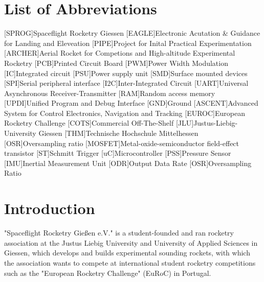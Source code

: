 \documentclass[fontsize=11pt,%
twoside,%
BCOR          = 8mm, %
DIV           = 11,  %
titlepage     = off,%
index=totoc,%
xcolor        = pdftex,%
dvipsnames,%
bibliography  = totoc,%
bibliography = numbered, %
listof        = notnumbered]{scrreprt}
\begin{document}
\chapter*{List of Abbreviations}
	\begin{acronym}
		[SPROG]{\dotfill Spaceflight Rocketry Giessen}
		[EAGLE]{\dotfill Electronic Acutation \& Guidance for Landing and Eleveation}
		{\dotfill Project for Inital Practical Experimentation}
		[ARCHER]{\dotfill Aerial Rocket for Competions and High-altitude Experimental Rocketry}
		[PCB]{\dotfill Printed Circuit Board}
		[PWM]{\dotfill Power Width Modulation}
		[IC]{\dotfill Integrated circuit}
		[PSU]{\dotfill Power supply unit}
		[SMD]{\dotfill Surface mounted devices}
		[SPI]{\dotfill Serial peripheral interface}
		[I2C]{\dotfill Inter-Integrated Circuit}
		{\dotfill Universal Asynchronous Receiver-Transmitter}
		[RAM]{\dotfill Random access memory}
		{\dotfill Unified Program and Debug Interface}
		[GND]{\dotfill Ground}
		[ASCENT]{\dotfill Advanced System for Control Electronics, Navigation and Tracking}
		[EUROC]{\dotfill European Rocketry Challenge}
		{\dotfill Commercial Off-The-Shelf}		
		[JLU]{\dotfill Justus-Liebig-University Giessen}
		[THM]{\dotfill Technische Hochschule Mittelhessen}
		[OSR]{\dotfill Oversampling ratio}
		[MOSFET]{\dotfill Metal-oxide-semiconductor field-effect transistor}
		[ST]{\dotfill Schmitt Trigger}
		[uC]{\dotfill Microcontroller}
		[PSS]{\dotfill Pressure Sensor}
		[IMU]{\dotfill Inertial Measurement Unit}
		[ODR]{\dotfill Output Data Rate}
		[OSR]{\dotfill Oversampling Ratio}
	\end{acronym}
	
	
\cleardoublepage


\setcounter{page}{1}

\chapter{Introduction}
"Spaceflight Rocketry Gießen e.V." is a student-founded and ran rocketry association at the Justus Liebig University and University of Applied Sciences in Giessen, which develops and builds experimental sounding rockets, with which the association wants to compete at international student rocketry competitions such as the "European Rocketry Challenge" (EuRoC) in Portugal.
\end{document}
